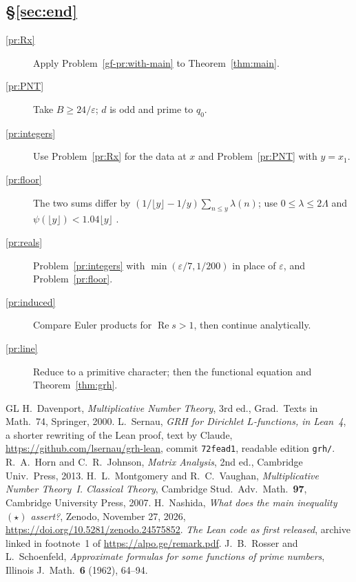 \documentclass[reqno]{amsart}
\theoremstyle{definition}
\theoremstyle{plain}
\begin{document}
\subsection*{\S\ref{sec:end}}
\begin{description}
\item[\ref{pr:Rx}] Apply Problem~\ref{gf-pr:with-main} to Theorem~\ref{thm:main}.
\item[\ref{pr:PNT}] Take \(B \ge 24/\varepsilon\); \(d\) is odd and prime to \(q_0\).
\item[\ref{pr:integers}] Use Problem~\ref{pr:Rx} for the data at \(x\) and Problem~\ref{pr:PNT} with \(y = x_1\).
\item[\ref{pr:floor}] The two sums differ by \((1/\lfloor y \rfloor - 1/y)\sum_{n \le y}\lambda(n)\); use \(0 \le \lambda \le 2\Lambda\) and \(\psi(\lfloor y \rfloor) < 1.04\lfloor y \rfloor\) \cite[Thm.~12]{RS}.
\item[\ref{pr:reals}] Problem~\ref{pr:integers} with \(\min(\varepsilon/7, 1/200)\) in place of \(\varepsilon\), and Problem~\ref{pr:floor}.
\item[\ref{pr:induced}] Compare Euler products for \(\operatorname{Re} s > 1\), then continue analytically.
\item[\ref{pr:line}] Reduce to a primitive character; then the functional equation and Theorem~\ref{thm:grh}.
\end{description}

{\small
\begin{thebibliography}{GL}
 H.~Davenport, \emph{Multiplicative Number Theory}, 3rd ed., Grad.\ Texts in Math.\ 74, Springer, 2000.
 L.~Sernau, \emph{GRH for Dirichlet \(L\)-functions, in Lean~4}, a shorter rewriting of the Lean proof, text by Claude, \url{https://github.com/lsernau/grh-lean}, commit \texttt{72fead1}, readable edition \texttt{grh/}.
 R.~A.~Horn and C.~R.~Johnson, \emph{Matrix Analysis}, 2nd ed., Cambridge Univ.\ Press, 2013.
 H.~L.~Montgomery and R.~C.~Vaughan, \emph{Multiplicative Number Theory~I. Classical Theory}, Cambridge Stud.\ Adv.\ Math.\ \textbf{97}, Cambridge University Press, 2007.
 H.~Nashida, \emph{What does the main inequality \((\star)\) assert?}, Zenodo, November 27, 2026, \url{https://doi.org/10.5281/zenodo.24575852}.
 \emph{The Lean code as first released}, archive linked in footnote~1 of \url{https://alpo.ge/remark.pdf}.
 J.~B.~Rosser and L.~Schoenfeld, \emph{Approximate formulas for some functions of prime numbers}, Illinois J.\ Math.\ \textbf{6} (1962), 64--94.
\end{thebibliography}
}
\end{document}
